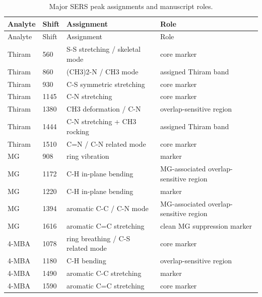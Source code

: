 {\scriptsize
\setlength{\tabcolsep}{2.5pt}
\renewcommand{\arraystretch}{1.08}
\begin{longtable}{L{1.7cm}L{1.3cm}L{7.3cm}L{4.2cm}}
\caption{Major SERS peak assignments and manuscript roles.}\label{tab:s2_peak_assignment}\\
\toprule
Analyte & Shift & Assignment & Role \\
\midrule
\endfirsthead
\toprule
Analyte & Shift & Assignment & Role \\
\midrule
\endhead
\endfoot
\bottomrule
\endlastfoot
Thiram & 560 & S-S stretching / skeletal mode & core marker \\
Thiram & 860 & (CH3)2-N / CH3 mode & assigned Thiram band \\
Thiram & 930 & C-S symmetric stretching & core marker \\
Thiram & 1145 & C-N stretching & core marker \\
Thiram & 1380 & CH3 deformation / C-N & overlap-sensitive region \\
Thiram & 1444 & C-N stretching + CH3 rocking & assigned Thiram band \\
Thiram & 1510 & C=N / C-N related mode & core marker \\
MG & 908 & ring vibration & marker \\
MG & 1172 & C-H in-plane bending & MG-associated overlap-sensitive region \\
MG & 1220 & C-H in-plane bending & marker \\
MG & 1394 & aromatic C-C / C-N mode & MG-associated overlap-sensitive region \\
MG & 1616 & aromatic C=C stretching & clean MG suppression marker \\
4-MBA & 1078 & ring breathing / C-S related mode & core marker \\
4-MBA & 1180 & C-H bending & overlap-sensitive region \\
4-MBA & 1490 & aromatic C-C stretching & marker \\
4-MBA & 1590 & aromatic C=C stretching & core marker \\
\end{longtable}
}


